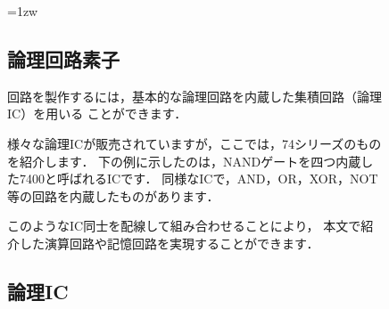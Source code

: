 \begin{figure}[bt]
\begin{framed}{\parindent=1zw
\subsection*{論理回路素子}
回路を製作するには，基本的な論理回路を内蔵した集積回路（論理IC）を用いる
ことができます．

様々な論理ICが販売されていますが，ここでは，74シリーズのものを紹介します．
下の例に示したのは，NANDゲートを四つ内蔵した7400と呼ばれるICです．
同様なICで，AND，OR，XOR，NOT等の回路を内蔵したものがあります．

このようなIC同士を配線して組み合わせることにより，
本文で紹介した演算回路や記憶回路を実現することができます．

\subsection*{論理IC}
\centerline{}
}\end{framed}
\end{figure}

